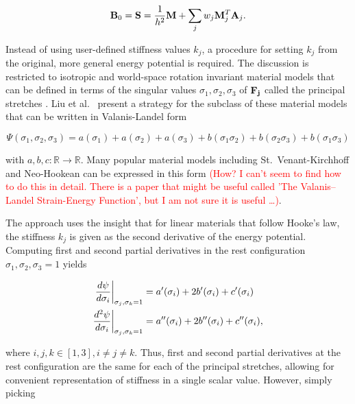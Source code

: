 \begin{equation}\label{eq:global-matrix-strain}
    \mathbf{B}_0 = \mathbf{S} = \frac{1}{h^2}\mathbf{M} + \sum_j w_j \mathbf{M}_j^T \mathbf{A}_j.
\end{equation}

Instead of using user-defined stiffness values $k_j$, a procedure for setting $k_j$ from the original, more general energy
potential is required. The discussion is restricted to isotropic and world-space rotation invariant material models that 
can be defined in terms of the singular 
values $\sigma_1, \sigma_2, \sigma_3$ of $\mathbf{F_j}$ called the principal stretches \cite{sifakis2012}. Liu et al.\ 
\cite{liu2017} present a strategy for the subclass of these material models that can be written in Valanis-Landel form

\begin{equation}\label{eq:valanis-landel}
    \Psi(\sigma_1, \sigma_2, \sigma_3) = a(\sigma_1) + a(\sigma_2) + a(\sigma_3) + b(\sigma_1 \sigma_2) 
    + b(\sigma_2 \sigma_3) + b(\sigma_1 \sigma_3)
\end{equation}

\noindent with $a, b, c : \mathbb{R} \to \mathbb{R}$. Many popular material models including St.\ Venant-Kirchhoff and 
Neo-Hookean 
can be expressed in this form \textcolor{red}{(How? I can't seem to find how to do this in detail. There is a paper that 
might be useful called 'The Valanis–Landel Strain-Energy Function', but I am not sure it is useful \ldots)}.

The approach uses the insight that for linear materials that follow Hooke's law, the stiffness $k_j$ is given as the second 
derivative of the energy potential. Computing first and second partial derivatives in the rest configuration $\sigma_1, 
\sigma_2, \sigma_3 = 1$ yields

\begin{align}
    \evalat[\bigg]{\frac{d \psi}{d \sigma_i}}{\sigma_j, \sigma_k = 1} 
    &= a^{\prime}(\sigma_i) + 2b^{\prime}(\sigma_i) + c^{\prime}(\sigma_i) \label{eq:valandis-landel-first} \\
    \evalat[\bigg]{\frac{d^2 \psi}{d \sigma_i}}{\sigma_j, \sigma_k = 1} 
    &= a^{\prime\prime}(\sigma_i) + 2b^{\prime\prime}(\sigma_i) + c^{\prime\prime}(\sigma_i) \label{eq:valandis-landel-second},
\end{align}

\noindent where $i, j, k \in [1, 3], i \neq j \neq k$. Thus, first and second partial derivatives at the rest configuration are the same
for each of the principal stretches, allowing for convenient representation of stiffness in a single scalar value. However,
simply picking

